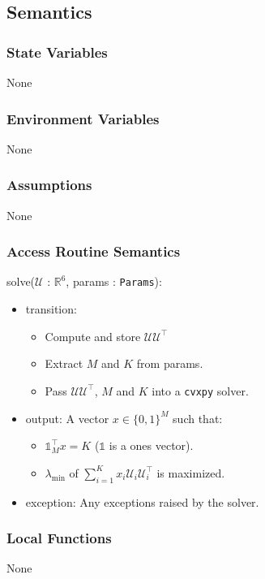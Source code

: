 \documentclass[12pt, titlepage]{article}
\begin{document}
\subsection{Semantics}

\subsubsection{State Variables}
None

\subsubsection{Environment Variables}
None 

\subsubsection{Assumptions}
None

\subsubsection{Access Routine Semantics}

\noindent solve($\mathcal{U}$ : $\mathbb{R}^6$, params : \texttt{Params}):
\begin{itemize}
\item transition: 
\begin{itemize}
  \item Compute and store $\mathcal{U} \mathcal{U}^\top$ 
  \item Extract $M$ and $K$ from params.
  \item Pass $\mathcal{U} \mathcal{U}^\top$, $M$ and $K$ into a \texttt{cvxpy} solver.
\end{itemize}
\item output: A vector $x \in \{ 0, 1 \}^M$ such that:
\begin{itemize}
  \item $\mathds{1}_M^\top x = K$ ($\mathds{1}$ is a ones vector).
  \item $\lambda_{\text{min}}$ of $\sum^K_{i=1} x_i \mathcal{U}_i \mathcal{U}_i^\top$ is maximized. 
\end{itemize}
\item exception: Any exceptions raised by the solver.  
\end{itemize}

\subsubsection{Local Functions}
None
\end{document}
